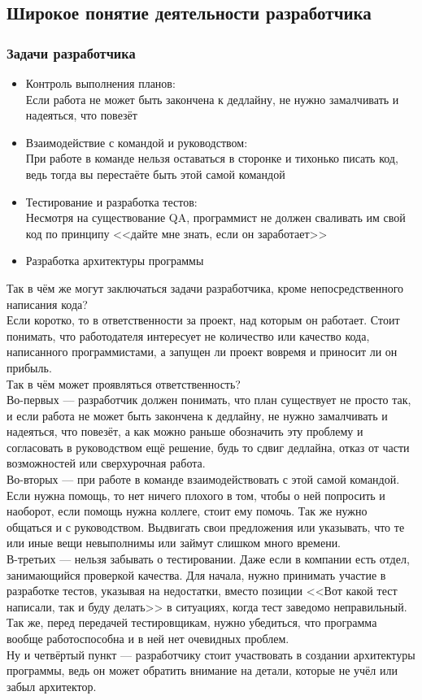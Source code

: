 \documentclass{../industrial-development}
\begin{document}
\subsection{Широкое понятие деятельности разработчика}
\begin{frame} \frametitle{Задачи разработчика}
  \begin{itemize}
  \item Контроль выполнения планов:\\
	Если работа не может быть закончена к дедлайну, не нужно замалчивать и надеяться, что повезёт
	\item Взаимодействие с командой и руководством:\\
	При работе в команде нельзя оставаться в сторонке и тихонько писать код, ведь тогда вы перестаёте быть этой самой командой
	\item Тестирование и разработка тестов:\\
	Несмотря на существование QA, программист не должен сваливать им свой код по принципу <<дайте мне знать, если он заработает>>
	\item Разработка архитектуры программы
  \end{itemize}
\end{frame}
\lecturenotes
Так в чём же могут заключаться задачи разработчика, кроме непосредственного написания кода?\\
Если коротко, то в ответственности за проект, над которым он работает. Стоит понимать, что работодателя интересует не количество или качество кода, написанного программистами, а запущен ли проект вовремя и приносит ли он прибыль.\\
Так в чём может проявляться ответственность?\\
Во-первых --- разработчик должен понимать, что план существует не просто так, и если работа не может быть закончена к дедлайну, не нужно замалчивать и надеяться, что повезёт, а как можно раньше обозначить эту проблему и согласовать в руководством ещё решение, будь то сдвиг дедлайна, отказ от части возможностей или сверхурочная работа.\\
Во-вторых --- при работе в команде взаимодействовать с этой самой командой. Если нужна помощь, то нет ничего плохого в том, чтобы о ней попросить и наоборот, если помощь нужна коллеге, стоит ему помочь. Так же нужно общаться и с руководством. Выдвигать свои предложения или указывать, что те или иные вещи невыполнимы или займут слишком много времени.\\
В-третьих --- нельзя забывать о тестировании. Даже если в компании есть отдел, занимающийся проверкой качества. Для начала, нужно принимать участие в разработке тестов, указывая на недостатки, вместо позиции <<Вот какой тест написали, так и буду делать>> в ситуациях, когда тест заведомо неправильный. Так же, перед передачей тестировщикам, нужно убедиться, что программа вообще работоспособна и в ней нет очевидных проблем.\\
Ну и четвёртый пункт --- разработчику стоит участвовать в создании архитектуры программы, ведь он может обратить внимание на детали, которые не учёл или забыл архитектор.
\end{document}

